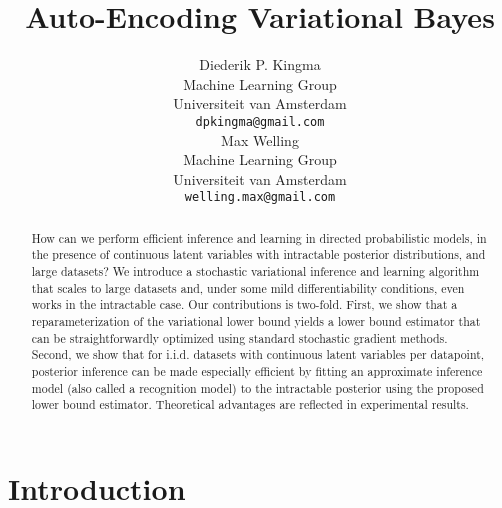 \documentclass{article} \usepackage{nips13submit_e,times}
\title{Auto-Encoding Variational Bayes}
\author{
Diederik P. Kingma \\
Machine Learning Group \\
Universiteit van Amsterdam \\
\texttt{dpkingma@gmail.com} \\
\And
Max Welling \\
Machine Learning Group \\
Universiteit van Amsterdam \\
\texttt{welling.max@gmail.com} \\
}
\theoremstyle{definition}
\theoremstyle{definition}
\begin{document}
\maketitle

\begin{abstract}
How can we perform efficient inference and learning in directed probabilistic models, in the presence of continuous latent variables with intractable posterior distributions, and large datasets?
We introduce a stochastic variational inference and learning algorithm that scales to large datasets and, under some mild differentiability conditions, even works in the intractable case. Our contributions is two-fold.
First, we show that a reparameterization of the variational lower bound yields a lower bound estimator that can be straightforwardly optimized using standard stochastic gradient methods.
Second, we show that for i.i.d. datasets with continuous latent variables per datapoint, posterior inference can be made especially efficient by fitting an approximate inference model (also called a recognition model) to the intractable posterior using the proposed lower bound estimator. 
Theoretical advantages are reflected in experimental results.
\end{abstract}

\begin{comment}
\begin{abstract}
How can we efficiently learn the parameters of directed probabilistic models, in the presence of continuous latent variables with intractable posterior distributions, and large datasets?
We introduce a stochastic variational inference and learning algorithm that scales to large datasets and, under some mild differentiability conditions, even works in the intractable case.
The algorithm, Stochastic Gradient Variational Bayes, optimizes a probabilistic encoder (also called a recognition model) to approximate the intractable posterior distribution of the latent variables.
A reparameterization of the variational bound with an independent noise variable yields a stochastic objective function which can be jointly optimized w.r.t. variational and generative parameters using standard gradient-based stochastic optimization methods.
Theoretical advantages are reflected in experimental results.
\end{abstract}
\end{comment}

\section{Introduction}
\end{document}
